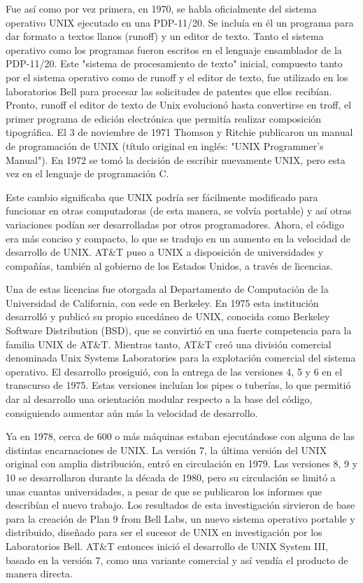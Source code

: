 Fue así como por vez primera, en 1970, se habla oficialmente del sistema operativo UNIX  ejecutado en una PDP-11/20. Se incluía en él un programa para dar formato a textos llanos 
(runoff) y un editor de texto. Tanto el sistema operativo como los programas fueron escritos en el lenguaje ensamblador de la PDP-11/20. Este "sistema de procesamiento de texto" 
inicial, compuesto tanto por el sistema operativo como de runoff y el editor de texto, fue utilizado en los laboratorios Bell para procesar las solicitudes de patentes que ellos 
recibían. Pronto, runoff el editor de texto de Unix evolucionó hasta convertirse en troff, el primer programa de edición electrónica que permitía realizar composición 
tipográfica. El 3 de noviembre de 1971 Thomson y Ritchie publicaron un manual de programación de UNIX (título original en inglés: "UNIX Programmer's Manual"). En 1972 se tomó la 
decisión de escribir nuevamente UNIX, pero esta vez en el lenguaje de programación C.

Este cambio significaba que UNIX podría ser fácilmente modificado para funcionar en otras computadoras (de esta manera, se volvía portable) y así otras variaciones podían ser 
desarrolladas por otros programadores. Ahora, el código era más conciso y compacto, lo que se tradujo en un aumento en la velocidad de desarrollo de UNIX. AT\&T puso a UNIX a 
disposición de universidades y compañías, también al gobierno de los Estados Unidos, a través de licencias.
 
Una de estas licencias fue otorgada al Departamento de Computación de la Universidad de California, con sede en Berkeley. En 1975 esta institución desarrolló y publicó su propio 
sucedáneo de UNIX, conocida como Berkeley Software Distribution (BSD), que se convirtió en una fuerte competencia para la familia UNIX de AT\&T. Mientras tanto, AT\&T creó una 
división comercial denominada Unix Systems Laboratories para la explotación comercial del sistema operativo. El desarrollo prosiguió, con la entrega de las versiones 4, 5 y 6 en 
el transcurso de 1975. Estas versiones incluían los pipes o tuberías, lo que permitió dar al desarrollo una orientación modular respecto a la base del código, consiguiendo 
aumentar aún más la velocidad de desarrollo.
 
Ya en 1978, cerca de 600 o más máquinas estaban ejecutándose con alguna de las distintas encarnaciones de UNIX. La versión 7, la última versión del UNIX original con amplia 
distribución, entró en circulación en 1979. Las versiones 8, 9 y 10 se desarrollaron durante la década de 1980, pero su circulación se limitó a unas cuantas universidades, a 
pesar de que se publicaron los informes que describían el nuevo trabajo. Los resultados de esta investigación sirvieron de base para la creación de Plan 9 from Bell Labs, un 
nuevo sistema operativo portable y distribuido, diseñado para ser el sucesor de UNIX en investigación por los Laboratorios Bell. AT\&T entonces inició el desarrollo de UNIX 
System III, basado en la versión 7, como una variante  comercial y así vendía el producto de manera directa.
 
